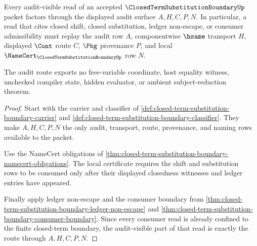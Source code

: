 \begin{theorem}
\label{thm:closed-term-substitution-boundary-audit-route}
Every audit-visible read of an accepted $\ClosedTermSubstitutionBoundaryUp$ packet factors through the displayed audit surface $A,H,C,P,N$. In particular, a read that cites closed shift, closed substitution, ledger non-escape, or consumer admissibility must replay the audit row $A$, componentwise $\hsame$ transport $H$, displayed $\Cont$ route $C$, $\Pkg$ provenance $P$, and local $\NameCert_{\ClosedTermSubstitutionBoundaryUp}$ row $N$.

The audit route exports no free-variable coordinate, host equality witness, unchecked compiler state, hidden evaluator, or ambient subject-reduction theorem.
\end{theorem}
\begin{proof}
Start with the carrier and classifier of \autoref{def:closed-term-substitution-boundary-carrier} and \autoref{def:closed-term-substitution-boundary-classifier}. They make $A,H,C,P,N$ the only audit, transport, route, provenance, and naming rows available to the packet.

Use the NameCert obligations of \autoref{thm:closed-term-substitution-boundary-namecert-obligations}. The local certificate requires the shift and substitution rows to be consumed only after their displayed closedness witnesses and ledger entries have appeared.

Finally apply ledger non-escape and the consumer boundary from \autoref{thm:closed-term-substitution-boundary-ledger-non-escape} and \autoref{thm:closed-term-substitution-boundary-consumer-boundary}. Since every consumer read is already confined to the finite closed-term boundary, the audit-visible part of that read is exactly the route through $A,H,C,P,N$.
\end{proof}

